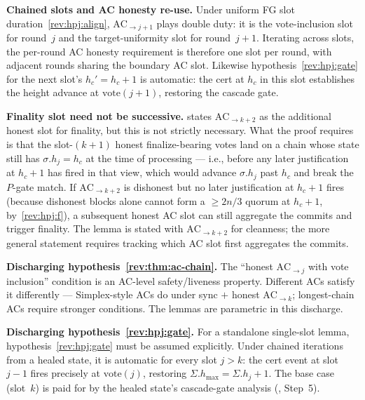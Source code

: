 \documentclass{article}
\newcommand{\hmax}{\ensuremath{h_{\max}}\xspace}
\newcommand{\vote}{\ensuremath{\mathrm{vote}}}
\renewcommand{\paragraph}[1]{\vspace{7pt}\noindent\textbf{#1}}
\theoremstyle{plain}
\theoremstyle{definition}
\theoremstyle{remark}
\begin{document}
\paragraph{Chained slots and AC honesty re-use.}
Under uniform FG slot duration~\ref{rev:hpj:align}, $\mathrm{AC}_{\to j+1}$ plays double duty: it is the vote-inclusion slot for round~$j$ and the target-uniformity slot for round~$j+1$. Iterating across slots, the per-round AC honesty requirement is therefore one slot per round, with adjacent rounds sharing the boundary AC slot. Likewise hypothesis~\ref{rev:hpj:gate} for the next slot's $h_c' = h_c + 1$ is automatic: the cert at $h_c$ in this slot establishes the height advance at $\vote(j+1)$, restoring the cascade gate.

\paragraph{Finality slot need not be successive.}
 states $\mathrm{AC}_{\to k+2}$ as the additional honest slot for finality, but this is not strictly necessary. What the proof requires is that the slot-$(k+1)$ honest finalize-bearing votes land on a chain whose state still has $\sigma.h_j = h_c$ at the time of processing --- i.e., before any later justification at $h_c + 1$ has fired in that view, which would advance $\sigma.h_j$ past $h_c$ and break the $P$-gate match. If $\mathrm{AC}_{\to k+2}$ is dishonest but no later justification at $h_c + 1$ fires (because dishonest blocks alone cannot form a $\geq 2n/3$ quorum at $h_c + 1$, by~\ref{rev:hpj:f}), a subsequent honest AC slot can still aggregate the commits and trigger finality. The lemma is stated with $\mathrm{AC}_{\to k+2}$ for cleanness; the more general statement requires tracking which AC slot first aggregates the commits.

\paragraph{Discharging hypothesis~\ref{rev:thm:ac-chain}.}
The ``honest $\mathrm{AC}_{\to j}$ with vote inclusion'' condition is an AC-level safety/liveness property. Different ACs satisfy it differently --- Simplex-style ACs do under sync $+$ honest $\mathrm{AC}_{\to k}$; longest-chain ACs require stronger conditions. The lemmas are parametric in this discharge.

\paragraph{Discharging hypothesis~\ref{rev:hpj:gate}.}
For a standalone single-slot lemma, hypothesis~\ref{rev:hpj:gate} must be assumed explicitly. Under chained iterations from a healed state, it is automatic for every slot $j > k$: the cert event at slot~$j-1$ fires precisely at $\vote(j)$, restoring $\Sigma.\hmax = \Sigma.h_j + 1$. The base case (slot~$k$) is paid for by the healed state's cascade-gate analysis (, Step~5).
\end{document}
